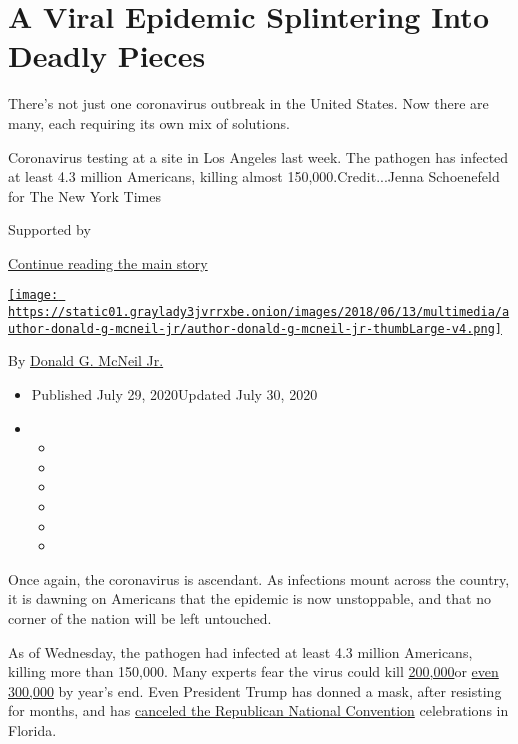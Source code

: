 \hypertarget{a-viral-epidemic-splintering-into-deadly-pieces}{%
\section{A Viral Epidemic Splintering Into Deadly
Pieces}\label{a-viral-epidemic-splintering-into-deadly-pieces}}

There's not just one coronavirus outbreak in the United States. Now
there are many, each requiring its own mix of solutions.

Coronavirus testing at a site in Los Angeles last week. The pathogen has
infected at least 4.3 million Americans, killing almost
150,000.Credit...Jenna Schoenefeld for The New York Times

Supported by

\protect\hyperlink{after-sponsor}{Continue reading the main story}

\href{https://www.nytimes3xbfgragh.onion/by/donald-g-mcneil-jr}{\texttt{[image: https://static01.graylady3jvrrxbe.onion/images/2018/06/13/multimedia/author-donald-g-mcneil-jr/author-donald-g-mcneil-jr-thumbLarge-v4.png]}}

By
\href{https://www.nytimes3xbfgragh.onion/by/donald-g-mcneil-jr}{Donald
G. McNeil Jr.}

\begin{itemize}
\item
  Published July 29, 2020Updated July 30, 2020
\item
  \begin{itemize}
  \item
  \item
  \item
  \item
  \item
  \item
  \end{itemize}
\end{itemize}

Once again, the coronavirus is ascendant. As infections mount across the
country, it is dawning on Americans that the epidemic is now
unstoppable, and that no corner of the nation will be left untouched.

As of Wednesday, the pathogen had infected at least 4.3 million
Americans, killing more than 150,000. Many experts fear the virus could
kill
\href{https://www.forbes.com/sites/mattperez/2020/07/07/imhe-model-projects-208255-us-deaths-by-november-but-estimate-falls-sharply-if-mask-use-increases/\#3c8ee9616f2e}{200,000}or
\href{https://www.cnbc.com/2020/07/22/dr-scott-gottlieb-us-coronavirus-deaths-may-hit-300000-by-year-end.html}{even
300,000} by year's end. Even President Trump has donned a mask, after
resisting for months, and has
\href{https://www.nytimes3xbfgragh.onion/2020/07/23/us/politics/jacksonville-rnc.html}{canceled
the Republican National Convention} celebrations in Florida.

